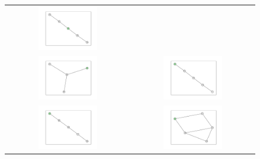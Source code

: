 \documentclass[12pt, a4paper]{extarticle}
\begin{document}
\begin{figure}
\begin{tabularx}{\textwidth}{cc}
\includegraphics[width=0.5\textwidth]{task11-graphlets/5_16-21-18-20-23.pdf} \\
\includegraphics[width=0.5\textwidth]{task11-graphlets/4_16-18-22-23.pdf} &
\includegraphics[width=0.5\textwidth]{task11-graphlets/5_5-10-14-21-23.pdf} \\
\includegraphics[width=0.5\textwidth]{task11-graphlets/5_16-17-18-20-23.pdf} &
\includegraphics[width=0.5\textwidth]{task11-graphlets/5_21-18-19-22-23.pdf} \\
\end{tabularx}\end{figure}
\end{document}
